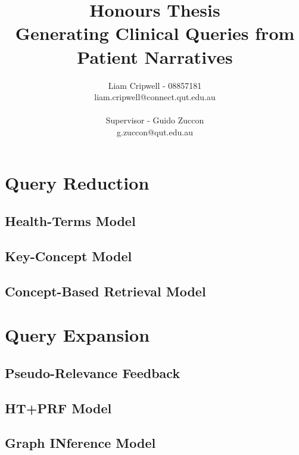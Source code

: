 \documentclass[a4paper]{article}
\begin{document}
\title{\small Honours Thesis\\\huge Generating Clinical Queries from Patient Narratives}

\author{Liam Cripwell - 08857181\\liam.cripwell@connect.qut.edu.au\\\\\small Supervisor - Guido Zuccon\\\small g.zuccon@qut.edu.au\\}
\maketitle
\pagebreak
\tableofcontents
\pagebreak

\section{Query Reduction}
\subsection{Health-Terms Model}
\subsection{Key-Concept Model}
\subsection{Concept-Based Retrieval Model}

\section{Query Expansion}
\subsection{Pseudo-Relevance Feedback}
\subsection{HT+PRF Model}
\subsection{Graph INference Model}




\end{document}
